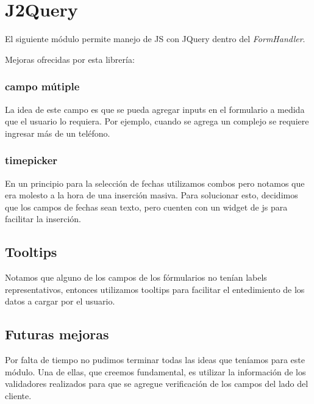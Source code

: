 \documentclass[a4paper,11pt]{article}
\begin{document}
\section{J2Query}
El siguiente módulo permite manejo de JS con JQuery dentro del
\textit{FormHandler}.

Mejoras ofrecidas por esta librería:
\subsubsection{campo mútiple}
La idea de este campo es que se pueda agregar inputs en el formulario
a medida que el usuario lo requiera. Por ejemplo, cuando se agrega
un complejo se requiere ingresar más de un teléfono.

\subsubsection{timepicker}
En un principio para la selección de fechas utilizamos combos pero notamos
que era molesto a la hora de una inserción masiva. Para solucionar esto,
decidimos que los campos de fechas sean texto, pero cuenten con un
widget de js para facilitar la inserción.

\subsection{Tooltips}
Notamos que alguno de los campos de los fórmularios no tenían labels
representativos, entonces utilizamos tooltips para facilitar el entedimiento
de los datos a cargar por el usuario.

\subsection{Futuras mejoras}
Por falta de tiempo no pudimos terminar todas las ideas que teníamos para
este módulo. Una de ellas, que creemos fundamental, es utilizar la información
de los validadores realizados para que se agregue verificación de los campos
del lado del cliente.
\end{document}
